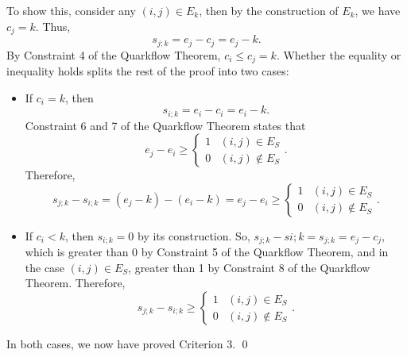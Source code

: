 \documentclass[review]{siamart0216}
\begin{document}
To show this, consider any $(i,j)\in E_k$, then by the construction of
$E_k$, we have $c_j = k$.  Thus,
$$s_{j;k} = e_j-c_j=e_j-k.$$
By Constraint 4 of the Quarkflow Theorem, $c_i \le c_j=k$.   Whether the
equality or inequality holds splits the rest of the proof into two cases:
\begin{itemize}
\item If $c_i=k$, then 
$$s_{i;k} = e_i-c_i=e_i-k.$$
Constraint 6 and 7 of the Quarkflow Theorem states that
$$e_j - e_i \ge
\begin{cases}
    1 & (i,j)\in E_S \\
    0 & (i,j)\notin E_S
\end{cases}.$$
Therefore,
$$ s_{j;k} - s_{i;k} = (e_j-k)-(e_i-k) = e_j-e_i\ge
\begin{cases}
    1 & (i,j)\in E_S \\
    0 & (i,j)\notin E_S
\end{cases}.$$
\item If $c_i<k$, then $s_{i;k} = 0$ by its construction.
So, $s_{j;k} - s{i;k} = s_{j;k} = e_j-c_j$, which is greater than 0
by Constraint 5 of the Quarkflow Theorem, and in the case $(i,j)\in E_S$,
greater than 1 by Constraint 8 of the Quarkflow Theorem.  Therefore,
$$ s_{j;k} - s_{i;k} \ge
\begin{cases}
    1 & (i,j)\in E_S \\
    0 & (i,j)\notin E_S
\end{cases}.$$
\end{itemize}
In both cases, we now have proved Criterion 3. \qed



\end{document}
